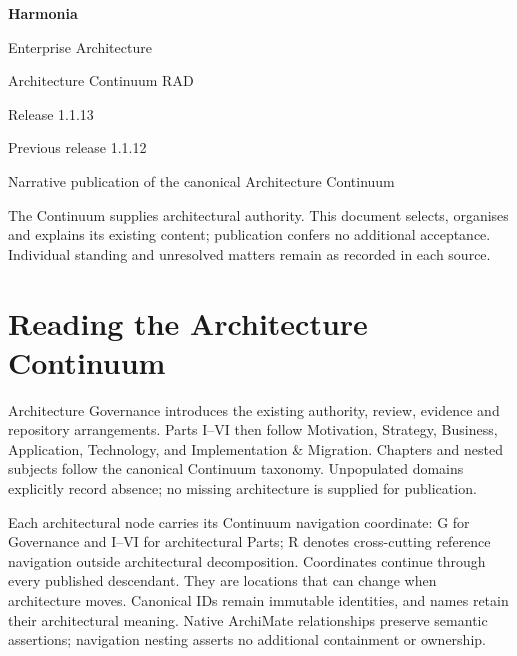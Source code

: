 \documentclass[10pt,a4paper,oneside,headings=small]{scrreprt}
\begin{document}
\hypersetup{pageanchor=false}
\begin{titlepage}
\vspace*{24mm}
{\Huge\bfseries\color{Ink} Harmonia\par}
\vspace{8mm}
{\LARGE Enterprise Architecture\par Architecture Continuum RAD\par}
\vspace{12mm}
{\Large Release 1.1.13\par Previous release 1.1.12\par}
\vfill
Narrative publication of the canonical Architecture Continuum\par
\vspace{8mm}
The Continuum supplies architectural authority. This document selects, organises
and explains its existing content; publication confers no additional acceptance.
Individual standing and unresolved matters remain as recorded in each source.
\end{titlepage}
\hypersetup{pageanchor=true}
\tableofcontents
\chapter*{Reading the Architecture Continuum}
Architecture Governance introduces the existing authority, review, evidence and
repository arrangements. Parts I--VI then follow Motivation, Strategy, Business,
Application, Technology, and Implementation \& Migration. Chapters and nested
subjects follow the canonical Continuum taxonomy. Unpopulated domains explicitly
record absence; no missing architecture is supplied for publication.

Each architectural node carries its Continuum navigation coordinate: G for
Governance and I--VI for architectural Parts; R denotes cross-cutting reference
navigation outside architectural decomposition. Coordinates continue through every
published descendant. They are locations that can change when architecture moves.
Canonical IDs remain immutable identities, and names retain their architectural
meaning. Native ArchiMate relationships preserve semantic assertions; navigation
nesting asserts no additional containment or ownership.
\end{document}
